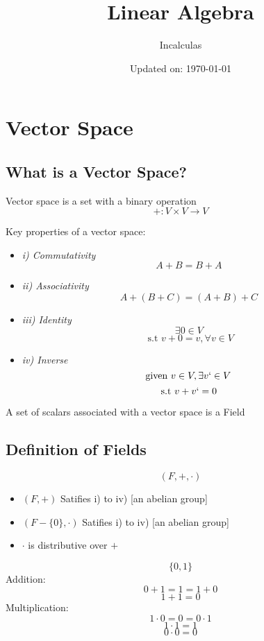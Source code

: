 \documentclass[11pt,a4paper]{colorart}
\title{\huge Linear Algebra}
\author{Incalculas}
\date{Updated on: \today}
\def\l{\left}
\def\r{\right}
\begin{document}
\maketitle
\tableofcontents
\newpage

\section{Vector Space}

\subsection{What is a Vector Space?}

Vector space is a set with a binary operation
	\[ +: V \times V \rightarrow V \]

Key properties of a vector space:

\begin{itemize}
	\item \textit{i) Commutativity}
			\[A + B = B + A \]
	\item \textit{ii) Associativity}
			\[ A + \l(B + C\r) = \l(A + B \r) + C\]
	\item \textit{iii) Identity}
		\[ \exists 0 \in V \]
		\[ \text{ s.t } v + 0 = v, \forall v \in V \]
	\item \textit{iv) Inverse}
		\[ \text{given } v \in V, \exists v` \in V \]
		\[ \text{s.t } v + v` = 0 \]
\end{itemize}

A set of scalars associated with a vector space is a Field \\

\subsection{Definition of Fields}

\begin{definition}[Fields]
	\[ \l(F, +, \cdot\r) \]
	\begin{itemize}
		\item $\l(F, +\r)$ Satifies i) to iv) [an abelian group]
		\item $\l(F -\{0\} , \cdot\r)$ Satifies i) to iv) [an abelian group]
		\item $\cdot$ is distributive over $+$
	\end{itemize}
\end{definition}

\begin{example}
	\[ \{0,1\} \]
	Addition:
	\[ 0 + 1 = 1 = 1 + 0 \]
	\[ 1 + 1 = 0 \]
	Multiplication:
	\[ 1 \cdot 0 = 0 = 0 \cdot 1\]
	\[ 1 \cdot 1 = 1 \]
	\[ 0 \cdot 0 = 0 \]
\end{example}
\end{document}
